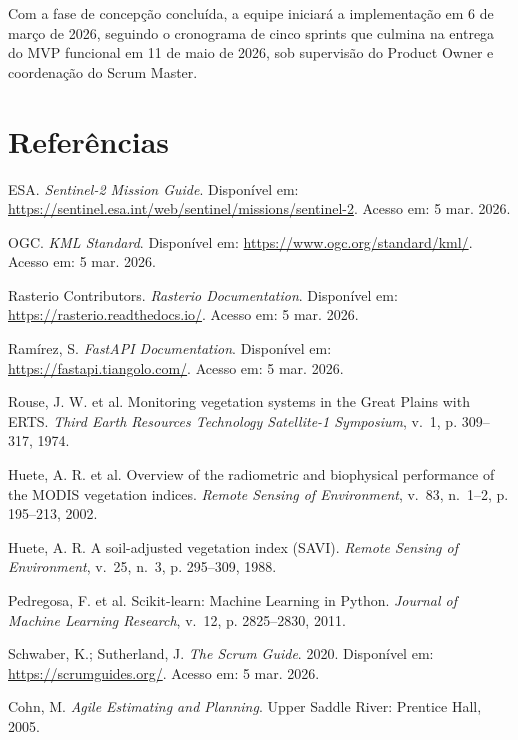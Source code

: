 \documentclass[12pt, a4paper]{article}
\begin{document}
Com a fase de concepção concluída, a equipe iniciará a implementação em 6 de março de 2026, seguindo o cronograma de cinco sprints que culmina na entrega do MVP funcional em 11 de maio de 2026, sob supervisão do Product Owner e coordenação do Scrum Master.

\newpage
\section*{Referências}

\begin{enumerate}[label={[\arabic*]}, leftmargin=*]
  \item ESA. \textit{Sentinel-2 Mission Guide}. Disponível em: \url{https://sentinel.esa.int/web/sentinel/missions/sentinel-2}. Acesso em: 5 mar. 2026.
  \item OGC. \textit{KML Standard}. Disponível em: \url{https://www.ogc.org/standard/kml/}. Acesso em: 5 mar. 2026.
  \item Rasterio Contributors. \textit{Rasterio Documentation}. Disponível em: \url{https://rasterio.readthedocs.io/}. Acesso em: 5 mar. 2026.
  \item Ramírez, S. \textit{FastAPI Documentation}. Disponível em: \url{https://fastapi.tiangolo.com/}. Acesso em: 5 mar. 2026.
  \item Rouse, J. W. et al. Monitoring vegetation systems in the Great Plains with ERTS. \textit{Third Earth Resources Technology Satellite-1 Symposium}, v.~1, p. 309--317, 1974.
  \item Huete, A. R. et al. Overview of the radiometric and biophysical performance of the MODIS vegetation indices. \textit{Remote Sensing of Environment}, v.~83, n.~1--2, p. 195--213, 2002.
  \item Huete, A. R. A soil-adjusted vegetation index (SAVI). \textit{Remote Sensing of Environment}, v.~25, n.~3, p. 295--309, 1988.
  \item Pedregosa, F. et al. Scikit-learn: Machine Learning in Python. \textit{Journal of Machine Learning Research}, v.~12, p. 2825--2830, 2011.
  \item Schwaber, K.; Sutherland, J. \textit{The Scrum Guide}. 2020. Disponível em: \url{https://scrumguides.org/}. Acesso em: 5 mar. 2026.
  \item Cohn, M. \textit{Agile Estimating and Planning}. Upper Saddle River: Prentice Hall, 2005.
\end{enumerate}
\end{document}
